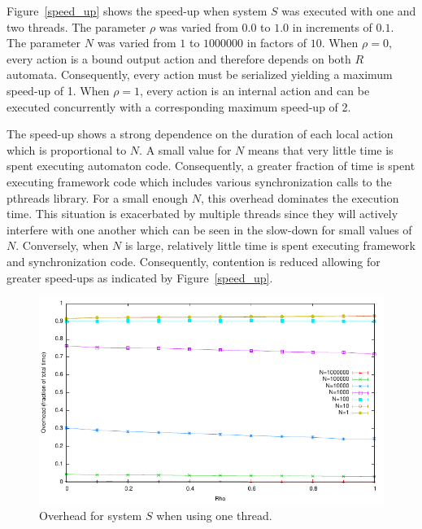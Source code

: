 Figure~\ref{speed_up} shows the speed-up when system $S$ was executed with one and two threads.
The parameter $\rho$ was varied from $0.0$ to $1.0$ in increments of $0.1$.
The parameter $N$ was varied from $1$ to $1000000$ in factors of $10$.
When $\rho = 0$, every action is a bound output action and therefore depends on both $R$ automata.
Consequently, every action must be serialized yielding a maximum speed-up of 1.
When $\rho = 1$, every action is an internal action and can be executed concurrently with a corresponding maximum speed-up of 2.

The speed-up shows a strong dependence on the duration of each local action which is proportional to $N$.
A small value for $N$ means that very little time is spent executing automaton code.
Consequently, a greater fraction of time is spent executing framework code which includes various synchronization calls to the pthreads library.
For a small enough $N$, this overhead dominates the execution time.
This situation is exacerbated by multiple threads since they will actively interfere with one another which can be seen in the slow-down for small values of $N$.
Conversely, when $N$ is large, relatively little time is spent executing framework and synchronization code.
Consequently, contention is reduced allowing for greater speed-ups as indicated by Figure~\ref{speed_up}.

\begin{figure}
\center
\includegraphics[width=\columnwidth]{overhead1}
\caption{Overhead for system $S$ when using one thread.\label{overhead1}}
\end{figure}

